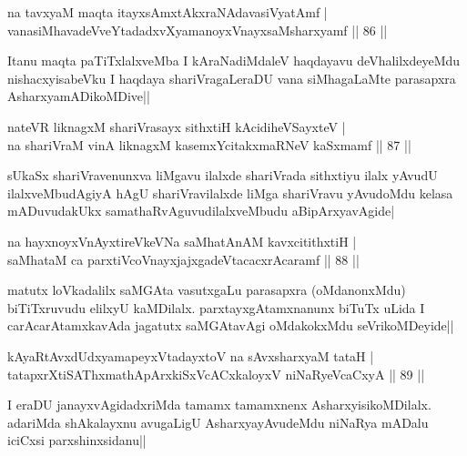 \begin{shl}
na tavxyaM maqta itayxsAmxtAkxraNAdavasiVyatAmf |\\
vanasiMhavadeVveYtadadxvXyamanoyxVnayxsaMsharxyamf \hfill || 86 ||
\end{shl}

\begin{artha}%
Itanu maqta paTiTxlalxveMba I kAraNadiMdaleV haqdayavu deVhalilxdeyeMdu nishacxyisabeVku I haqdaya shariVragaLeraDU vana siMhagaLaMte parasapxra AsharxyamADikoMDive||
\end{artha}


\begin{shl}
nateVR liknagxM shariVrasayx sithxtiH kAcidiheVSayxteV |\\
na shariVraM vinA liknagxM kasemxYcitakxmaRNeV kaSxmamf \hfill || 87 ||
\end{shl}

\begin{artha}
sUkaSx shariVravenunxva liMgavu ilalxde shariVrada sithxtiyu ilalx yAvudU ilalxveMbudAgiyA hAgU shariVravilalxde liMga shariVravu yAvudoMdu kelasa mADuvudakUkx samathaRvAguvudilalxveMbudu aBipArxyavAgide|
\end{artha}

\begin{shl}
na hayxnoyxVnAyxtireVkeVNa saMhatAnAM kavxcitithxtiH |\\
saMhataM ca parxtiVcoV\s nayxjajxgadeVtacacxrAcaramf \hfill || 88 ||
\end{shl}

\begin{artha}
matutx loVkadalilx saMGAta vasutxgaLu parasapxra (oMdanonxMdu) biTiTxruvudu elilxyU kaMDilalx. parxtayxgAtamxnanunx biTuTx uLida I carAcarAtamxkavAda jagatutx saMGAtavAgi oMdakokxMdu seVrikoMDeyide||
\end{artha}


\begin{shl}
kAyaRtAvxdUdxyamapeyxVtadayxtoV na sAvxsharxyaM tataH |\\
tatapxrXtiSAThxmathApArxkiSxVcACxkaloyxV niNaRyeVcaCxyA \hfill || 89 ||
\end{shl}

\begin{artha}
I eraDU janayxvAgidadxriMda tamamx tamamxnenx AsharxyisikoMDilalx. adariMda shAkalayxnu avugaLigU AsharxyayAvudeMdu niNaRya mADalu iciCxsi parxshinxsidanu||
\end{artha}%

